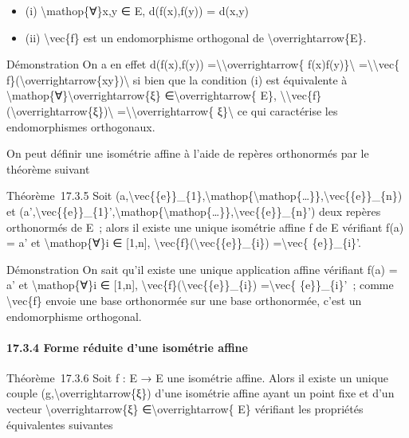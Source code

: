 \documentclass[]{article}
\begin{document}
\begin{itemize}
\itemsep1pt\parskip0pt
\item
  (i) \textbackslash{}mathop\{∀\}x,y ∈ E, d(f(x),f(y)) = d(x,y)
\item
  (ii) \textbackslash{}vec\{f\} est un endomorphisme orthogonal de
  \textbackslash{}overrightarrow\{E\}.
\end{itemize}

Démonstration On a en effet d(f(x),f(y))
=\textbackslash{}\textbar{}\textbackslash{}overrightarrow\{
f(x)f(y)\}\textbackslash{}\textbar{}
=\textbackslash{}\textbar{}\textbackslash{}vec\{
f\}(\textbackslash{}overrightarrow\{xy\})\textbackslash{}\textbar{} si
bien que la condition (i) est équivalente à
\textbackslash{}mathop\{∀\}\textbackslash{}overrightarrow\{ξ\}
∈\textbackslash{}overrightarrow\{ E\},
\textbackslash{}\textbar{}\textbackslash{}vec\{f\}(\textbackslash{}overrightarrow\{ξ\})\textbackslash{}\textbar{}
=\textbackslash{}\textbar{}\textbackslash{}overrightarrow\{
ξ\}\textbackslash{}\textbar{} ce qui caractérise les endomorphismes
orthogonaux.

On peut définir une isométrie affine à l'aide de repères orthonormés par
le théorème suivant

Théorème~17.3.5 Soit
(a,\textbackslash{}vec\{\{e\}\}\_\{1\},\textbackslash{}mathop\{\textbackslash{}mathop\{\ldots{}\}\},\textbackslash{}vec\{\{e\}\}\_\{n\})
et
(a',\textbackslash{}vec\{\{e\}\}\_\{1\}',\textbackslash{}mathop\{\textbackslash{}mathop\{\ldots{}\}\},\textbackslash{}vec\{\{e\}\}\_\{n\}')
deux repères orthonormés de E~; alors il existe une unique isométrie
affine f de E vérifiant f(a) = a' et \textbackslash{}mathop\{∀\}i ∈
{[}1,n{]}, \textbackslash{}vec\{f\}(\textbackslash{}vec\{\{e\}\}\_\{i\})
=\textbackslash{}vec\{ \{e\}\}\_\{i\}'.

Démonstration On sait qu'il existe une unique application affine
vérifiant f(a) = a' et \textbackslash{}mathop\{∀\}i ∈ {[}1,n{]},
\textbackslash{}vec\{f\}(\textbackslash{}vec\{\{e\}\}\_\{i\})
=\textbackslash{}vec\{ \{e\}\}\_\{i\}'~; comme \textbackslash{}vec\{f\}
envoie une base orthonormée sur une base orthonormée, c'est un
endomorphisme orthogonal.

\paragraph{17.3.4 Forme réduite d'une isométrie affine}

Théorème~17.3.6 Soit f : E → E une isométrie affine. Alors il existe un
unique couple (g,\textbackslash{}overrightarrow\{ξ\}) d'une isométrie
affine ayant un point fixe et d'un vecteur
\textbackslash{}overrightarrow\{ξ\} ∈\textbackslash{}overrightarrow\{
E\} vérifiant les propriétés équivalentes suivantes
\end{document}
